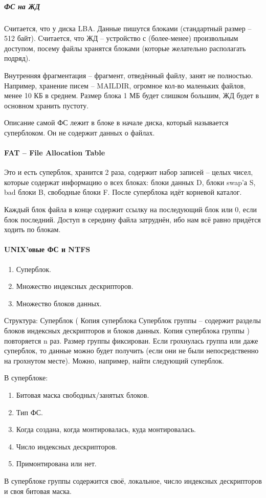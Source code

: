 \documentclass[a4paper,10pt]{article}
\begin{document}
\subparagraph{ФС на ЖД}
Считается, что у диска LBA. Данные пишутся блоками (стандартный размер -- 512 байт). Считается, что ЖД -- устройство с (более-менее) произвольным доступом, посему файлы хранятся блоками (которые желательно располагать подряд).

Внутренняя фрагментация -- фрагмент, отведённый файлу, занят не полностью. 
Например, хранение писем -- MAILDIR, огромное кол-во маленьких файлов, менее 10 КБ в среднем. Размер блока 1 МБ будет слишком большим, ЖД будет в основном хранить пустоту.

Описание самой ФС лежит в блоке в начале диска, который называется суперблоком. Он не содержит данных о файлах.

\paragraph{FAT -- File Allocation Table}
Это и есть суперблок, хранится 2 раза, содержит набор записей -- целых чисел, которые содержат информацию о всех блоках: блоки данных D, блоки swap'а S, bad блоки B, свободные блоки F.
После суперблока идёт корневой каталог.

Каждый блок файла в конце содержит ссылку на последующий блок или 0, если блок последний. Доступ в середину файла затруднён, ибо нам всё равно придётся ходить по блокам.

\paragraph{UNIX'овые ФС и NTFS}
\begin{enumerate}
 \item Суперблок.
 \item Множество индексных дескрипторов.
 \item Множество блоков данных.
\end{enumerate}
Структура:
Суперблок
(
Копия суперблока
Суперблок группы -- содержит разделы блоков индексных дескрипторов и блоков данных.
Копия суперблока группы
) повторяется n раз.
Размер группы фиксирован. Если грохнулась группа или даже суперблок, то данные можно будет получить (если они не были непосредственно на грохнутом месте). Можно, например, найти следующий суперблок.

В суперблоке:
\begin{enumerate}
 \item Битовая маска свободных/занятых блоков.
 \item Тип ФС.
 \item Когда создана, когда монтировалась, куда монтировалась.
 \item Число индексных дескрипторов.
 \item Примонтирована или нет.
\end{enumerate}
В суперблоке группы содержится своё, локальное, число индексных дескрипторов и своя битовая маска.
\end{document}
